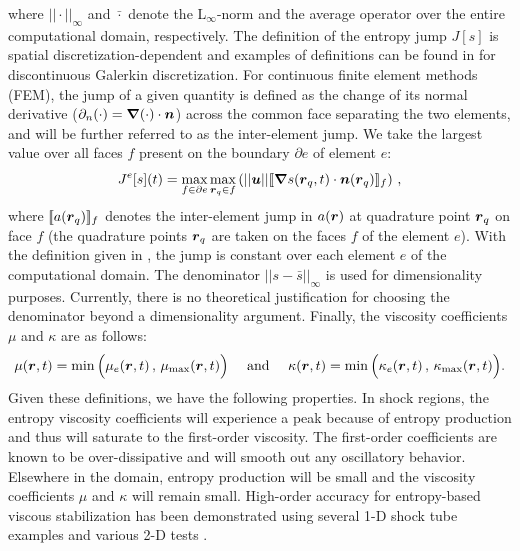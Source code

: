 %
where $|| \cdot ||_\infty$ and $\bar{\cdot}$ denote the L$_\infty$-norm and the average operator over the entire computational domain, respectively. The definition of the entropy jump $J[s]$ is spatial discretization-dependent and examples of definitions can be found in \cite{valentin} for discontinuous Galerkin discretization. For continuous finite element methods (FEM), the jump of a given quantity is defined as the change of its normal derivative ($\partial_n (\cdot) = \boldsymbol{\nabla}(\cdot) \cdot \boldsymbol n$) across the common face separating the two elements, and will be further referred to as the inter-element jump. We take the largest value over all faces $f$ present on the boundary $\partial e$ of element $e$:
%
\begin{equation}
\label{eq:jump_CFEM}
J^e[s](t) = \max_{f\in\partial e}  \max_{\boldsymbol r_q \in f} \left( || \boldsymbol u || [\![\boldsymbol{\nabla} s(\boldsymbol r_q,t) \cdot \boldsymbol n(\boldsymbol r_q) ]\!]_f \right) \, ,
\end{equation}
%
where $[\![a(\boldsymbol r_q)]\!]_f$ denotes the inter-element jump in $a(\boldsymbol r)$ at quadrature point $\boldsymbol r_q$ on face $f$ (the quadrature points $\boldsymbol r_q$ are taken on the faces $f$ of the element $e$). With the definition given in , the jump is constant over each element $e$ of the computational domain. 
The denominator $|| s - \bar{s} ||_\infty$ is used for dimensionality purposes.
Currently, there is no theoretical justification for choosing the denominator beyond a dimensionality argument. 
Finally, the viscosity coefficients $\mu$ and $\kappa$ are as follows:
%
\begin{equation}
\mu(\boldsymbol r,t)    = \min\Big( \mu_e(\boldsymbol r,t)   \,,\, \mu_{\max}(\boldsymbol r,t)    \Big) 
\quad \text{ and } \quad 
\kappa(\boldsymbol r,t) = \min\Big( \kappa_e(\boldsymbol r,t)\,,\, \kappa_{\max}(\boldsymbol r,t) \Big).
\end{equation}
%
Given these definitions, we have the following properties.
In shock regions, the entropy viscosity coefficients will experience a peak because of entropy production and thus will saturate to the first-order viscosity. The first-order coefficients are known to be over-dissipative and will smooth out any oscillatory behavior. Elsewhere in the domain, entropy production will be small and the viscosity coefficients $\mu$ and $\kappa$ will remain small. %
High-order accuracy for entropy-based viscous stabilization has been demonstrated using several 1-D shock tube examples and various 2-D tests \cite{jlg1, jlg2, valentin}.

